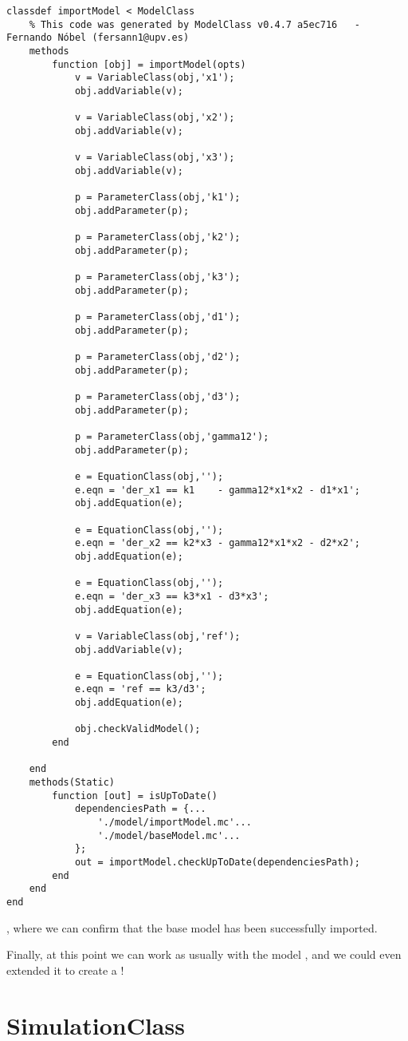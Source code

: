 \documentclass[11pt]{article}
\begin{document}
\begin{lstlisting}
classdef importModel < ModelClass
	% This code was generated by ModelClass v0.4.7 a5ec716   -   Fernando Nóbel (fersann1@upv.es)
	methods
		function [obj] = importModel(opts)
			v = VariableClass(obj,'x1');
			obj.addVariable(v);

			v = VariableClass(obj,'x2');
			obj.addVariable(v);

			v = VariableClass(obj,'x3');
			obj.addVariable(v);

			p = ParameterClass(obj,'k1');
			obj.addParameter(p);

			p = ParameterClass(obj,'k2');
			obj.addParameter(p);

			p = ParameterClass(obj,'k3');
			obj.addParameter(p);

			p = ParameterClass(obj,'d1');
			obj.addParameter(p);

			p = ParameterClass(obj,'d2');
			obj.addParameter(p);

			p = ParameterClass(obj,'d3');
			obj.addParameter(p);

			p = ParameterClass(obj,'gamma12');
			obj.addParameter(p);

			e = EquationClass(obj,'');
			e.eqn = 'der_x1 == k1    - gamma12*x1*x2 - d1*x1';
			obj.addEquation(e);

			e = EquationClass(obj,'');
			e.eqn = 'der_x2 == k2*x3 - gamma12*x1*x2 - d2*x2';
			obj.addEquation(e);

			e = EquationClass(obj,'');
			e.eqn = 'der_x3 == k3*x1 - d3*x3';
			obj.addEquation(e);

			v = VariableClass(obj,'ref');
			obj.addVariable(v);

			e = EquationClass(obj,'');
			e.eqn = 'ref == k3/d3';
			obj.addEquation(e);

			obj.checkValidModel();
		end

	end
	methods(Static)
		function [out] = isUpToDate()
			dependenciesPath = {...
				'./model/importModel.mc'...
				'./model/baseModel.mc'...
			};
			out = importModel.checkUpToDate(dependenciesPath);
		end
	end
end
\end{lstlisting}

, where we can confirm that the base model has been successfully imported.

Finally, at this point we can work as usually with the model , and we could even extended it to create a !

\section{SimulationClass}
\end{document}
